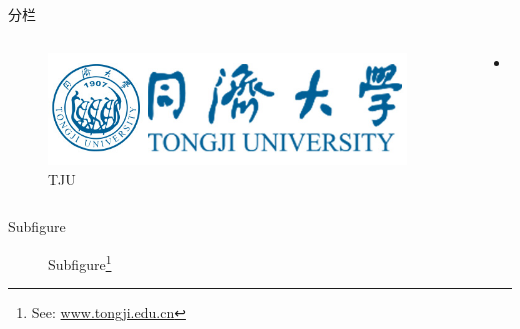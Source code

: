 \documentclass[hyperref,UTF8,10pt]{beamer}
\numberwithin{equation}{section} %
\begin{document}
\begin{frame}{分栏}
    \begin{columns}
        \begin{column}{0.3\textwidth}
            \begin{figure}
                \centering
                \includegraphics[width=0.95\textwidth]{tj_logo.jpg}
                \caption{TJU}\label{fig:tju}
            \end{figure}
        \end{column}
        \begin{column}{0.7\textwidth}
            \begin{itemize}
                \item ...
            \end{itemize}
        \end{column}
    \end{columns}
\end{frame}

\begin{frame}{Subfigure}
    \begin{figure}
        \centering
        \caption{Subfigure\footnote{See: \url{www.tongji.edu.cn}}}\label{fig:rnn}
    \end{figure}
\end{frame}
\end{document}
